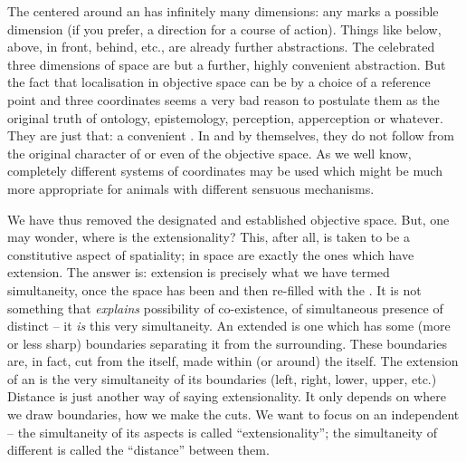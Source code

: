 The  centered around an   has infinitely many
dimensions: any  marks a possible dimension (if you prefer, a
direction for a course of action).  Things like below, above, in front, behind,
etc., are already further abstractions.  The celebrated three dimensions of
space are but a further, highly convenient abstraction. But the fact that
localisation in objective space can be  by a choice of a
reference point and three coordinates seems a very bad reason to postulate them
as the original truth of ontology, epistemology, perception, apperception or
whatever.  They are just that: a convenient .  In and by
themselves, they do not follow from the original character of  or
even of the objective space. As we well know, completely different systems of
coordinates may be used which might be much more appropriate for animals with
different sensuous mechanisms.

\pa We have thus removed the designated  and established objective
space. But, one may wonder, where is the extensionality?  This, after all, is
taken to be a constitutive aspect of spatiality;  in space are
exactly the ones which have extension. The answer is: extension is precisely
what we have termed simultaneity, once the space has been  and
then re-filled with the . It is not something that {\em explains}
possibility of co-existence, of simultaneous presence of distinct 
-- it {\em is} this very simultaneity. An extended  is one which has
some (more or less sharp) boundaries separating it from the surrounding.  These
boundaries are, in fact, {cut} from the  itself,
 made within (or around) the  itself.
The extension of an  is the very simultaneity of its boundaries
(left, right, lower, upper, etc.) Distance is just another way of saying
extensionality. It only depends on where we draw boundaries, how we make the
{cuts}. We want to focus on an independent  -- the simultaneity of
its aspects is called ``extensionality''; the simultaneity of different
 is called the ``distance'' between them.

